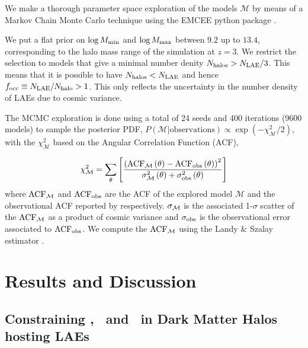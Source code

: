 \documentclass{emulateapj}
\newcommand{\mmin}{{\ifmmode{{M_{\rm min}}}\else{${M_{\rm min}}$}\fi}}
\newcommand{\mmax}{{\ifmmode{{M_{\rm max}}}\else{${M_{\rm max}}$}\fi}}
\newcommand{\focc}{{\ifmmode{{f_{\rm occ}}}\else{${f_{\rm occ}}$}\fi}}
\begin{document}
We make a thorough parameter space exploration of the models
${\mathcal M}$ by  means of a Markov Chain Monte Carlo technique using
the EMCEE python package \citep{emcee2013}. 

We put a flat prior on $\log M_{\rm min}$ and $\log \mmax$ between
$9.2$ up to $13.4$, corresponding to the halo mass range of 
the simulation at $z=3$.  
We restrict the selection to models that give a minimal number denity $N_{\rm{halos}}>N_{\rm
  LAE}/3$.  
This means that it is possible to have $N_{\rm
  {halos}} < N_{\rm LAE}$ and hence $\focc\equiv N_{\rm LAE}/N_{\rm
  halo}>1$.  
This only reflects the uncertainty in the number 
density of LAEs due to cosmic variance.    


The MCMC exploration is done using a total of 24 seeds and 400
iterations (9600 models) to sample the posterior PDF,
$P(\mathcal{M}|\mathrm{observations}) \propto \exp(-\chi_{\mathcal
  M}^2/2)$, with the $\chi_{\mathcal{M}}^2$ based on the Angular
Correlation Function (ACF), 

\begin{equation}
\chi_{\mathcal M}^2=
\sum_{\theta}\left[\frac{\left( \rm{ACF}_{\mathcal
      M}\left(\theta\right) - \rm{ACF}_{\rm
      obs}\left(\theta\right)\right)^2}{ \sigma_{\rm \mathcal
      M}^{2}\left(\theta\right) + \sigma_{\rm
      obs}^{2}\left(\theta\right)}\right] 
\end{equation}
%
where  $\rm{ACF}_{\mathcal M}$ and  $\rm{ACF}_{\rm obs}$ are the ACF
of the explored model ${\mathcal M}$ and the observational ACF
reported by \citet{Bielby16} respectively. 
$\sigma_{\rm \mathcal M}$ is the associated 1-$\sigma$ scatter  of the
$\rm{ACF}_{\mathcal M}$ as a product of cosmic variance and
$\sigma_{\rm obs}$ is the observational error associated to
$\rm{ACF}_{\rm obs}$.   
We compute the $\rm{ACF}_{\mathcal M}$ using the Landy \&  Szalay
estimator  \citep{Landy1993}.   




\section{Results and Discussion}




\subsection{Constraining \mmin, \mmax\ and \focc\ in Dark Matter Halos hosting LAEs} 
\end{document}
